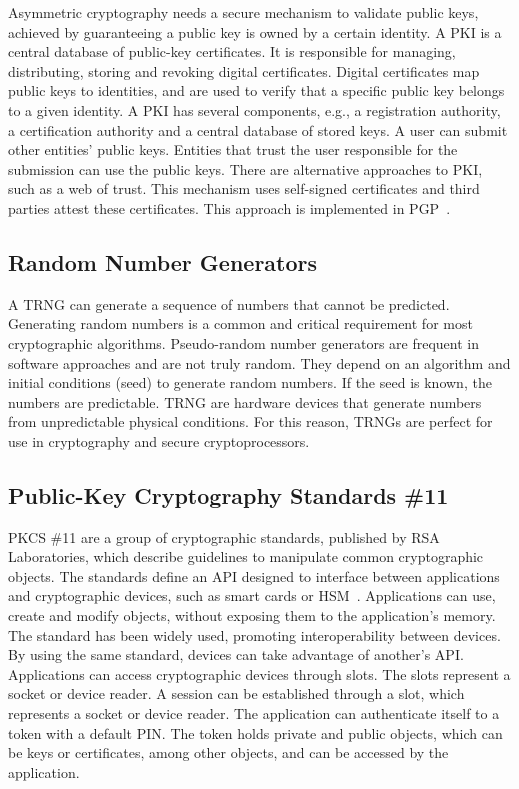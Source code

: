 Asymmetric cryptography needs a secure mechanism to validate public keys, achieved by guaranteeing a public key is owned by a certain identity.
A \ac{PKI} is a central database of public-key certificates. It is responsible for managing, distributing, storing and revoking digital certificates. Digital certificates map public keys to identities, and are used to verify that a specific public key belongs to a given identity.
A \ac{PKI} has several components, e.g., a registration authority, a certification authority and a central database of stored keys.
A user can submit other entities' public keys. Entities that trust the user responsible for the submission can use the public keys.
There are alternative approaches to \ac{PKI}, such as a web of trust. This mechanism uses self-signed certificates and third parties attest these certificates. This approach is implemented in \ac{PGP}~\cite{modelingPKI}.

\subsection{Random Number Generators}

A \ac{TRNG} can generate a sequence of numbers that cannot be predicted. Generating random numbers is a common and critical requirement for most cryptographic algorithms. Pseudo-random number generators are frequent in software approaches and are not truly random. They depend on an algorithm and initial conditions (seed) to generate random numbers. If the seed is known, the numbers are predictable.
\ac{TRNG} are hardware devices that generate numbers from unpredictable physical conditions. For this reason, \ac{TRNG}s are perfect for use in cryptography and secure cryptoprocessors.

\subsection{Public-Key Cryptography Standards \#11}
\ac{PKCS} \#11 are a group of cryptographic standards, published by RSA Laboratories, which describe guidelines to manipulate common cryptographic objects.
The standards define an \ac{API} designed to interface between applications and cryptographic devices, such as smart cards or \ac{HSM}~\cite{pkcs11analysis}. 
Applications can use, create and modify objects, without exposing them to the application's memory.
The standard has been widely used, promoting interoperability between devices. By using the same standard, devices can take advantage of another's \ac{API}.
Applications can access cryptographic devices through slots. The slots represent a socket or device reader. A session can be established through a slot, which represents a socket or device reader. The application can authenticate itself to a token with a default \ac{PIN}. The token holds private and public objects, which can be keys or certificates, among other objects, and can be accessed by the application.

